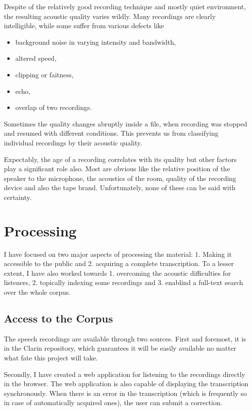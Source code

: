\documentclass[a4paper,11pt]{article}
\begin{document}
Despite of the relatively good recording technique and mostly quiet environment,
the resulting acoustic quality varies wildly. Many recordings are clearly
intelligible, while some suffer from various defects like
\begin{itemize}
\item{background noise in varying intensity and bandwidth,}
\item{altered speed,}
\item{clipping or faitness,}
\item{echo,}
\item{overlap of two recordings.}
\end{itemize}

Sometimes the quality changes abruptly inside a file, when recording was stopped
and resumed with different conditions. This prevents us from classifying
individual recordings by their acoustic quality.

Expectably, the age of a recording correlates with its quality but other factors
play a significant role also. Most are obvious like the relative position
of the speaker to the microphone, the acoustics of the room, quality of the
recording device and also the tape brand. Unfortunately, none of these can be
said with certainty.

\section{Processing}

I have focused on two major aspects of processing the material: 1. Making it
accessible to the public and 2. acquiring a complete transcription. To a lesser
extent, I have also worked towards 1. overcoming the acoustic difficulties for
listeners, 2. topically indexing some recordings and 3. enablind a full-text
search over the whole corpus.

\subsection{Access to the Corpus}

The speech recordings are available through two sources. First and foremost,
it is in the Clarin repository, which guarantees it will be easily available no
matter what fate this project will take.

Secondly, I have created a web application for listening to the recordings
directly in the browser. The web application is also capable of displaying the
transcription synchronously. When there is an error in the transcription (which
is frequently so in case of automatically acquired ones), the user can submit a
correction.
\end{document}
